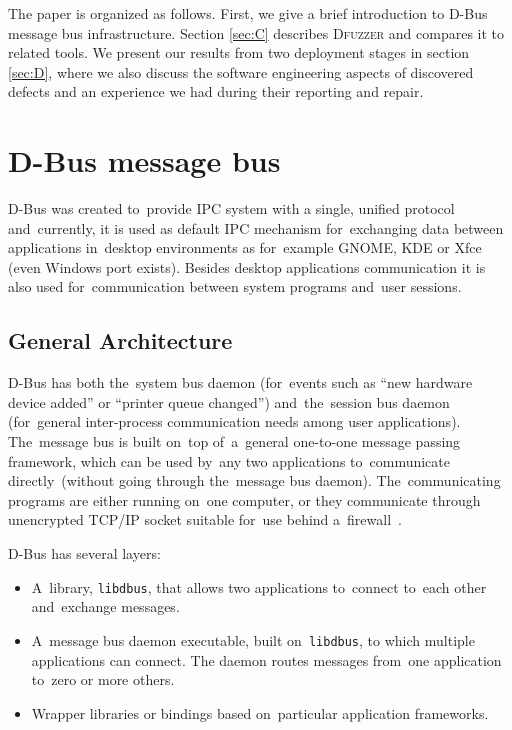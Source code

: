 \documentclass[conference]{IEEEtran}
\begin{document}
The paper is organized as follows. First, we give a brief introduction to D-Bus
message bus infrastructure. Section \ref{sec:C} describes \textsc{Dfuzzer} and compares
it to related tools. We present our results from two deployment stages in
section \ref{sec:D}, where we also discuss the software engineering aspects of
discovered defects and an experience we had during their reporting and repair.

\section{D-Bus message bus}
\label{sec:B}
D-Bus was created to~provide IPC system with a single, unified protocol
and~currently, it is used as default IPC mechanism for~exchanging data between
applications in~desktop environments as for~example GNOME, KDE or Xfce (even
Windows port exists). Besides desktop applications communication it is also used
for~communication between system programs and~user sessions.

\subsection{General Architecture}

D-Bus has both the~system bus daemon (for~events such as ``new hardware device
added'' or ``printer queue changed'') and~the~session bus daemon (for~general
inter-process communication needs among user \mbox{applications}). The~message
bus is built on~top of~a~general one-to-one message passing framework, which
can be used by~any two applications to~communicate directly~(without going
through the~message bus daemon). The~communicating programs are either running
on~one computer, or they communicate through unencrypted TCP/IP socket suitable
for~use behind a~firewall~\cite{dbus}.


D-Bus has several layers:
\begin{itemize}
	\item A~library, \texttt{libdbus}, that allows two applications to~connect
		to~each other and~exchange messages.
	\item A~message bus daemon executable, built on~\texttt{libdbus},
		to which multiple applications can connect. The daemon routes
		messages from~one application to~zero or more others.
	\item Wrapper libraries or bindings based on~particular application frameworks.
\end{itemize}
\end{document}
